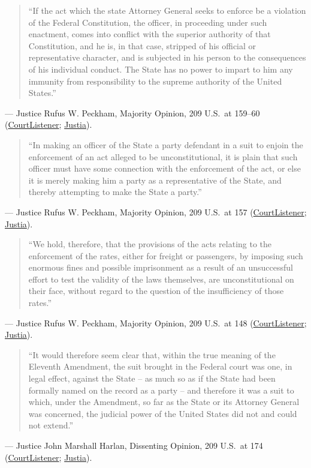 \documentclass[12pt]{article}
\begin{document}
\begin{quote}
``If the act which the state Attorney General seeks to enforce be a violation of the Federal Constitution, the officer, in proceeding under such enactment, comes into conflict with the superior authority of that Constitution, and he is, in that case, stripped of his official or representative character, and is subjected in his person to the consequences of his individual conduct. The State has no power to impart to him any immunity from responsibility to the supreme authority of the United States.''
\end{quote}
\noindent --- Justice Rufus W. Peckham, Majority Opinion, 209 U.S.\ at 159--60 (\href{https://www.courtlistener.com/opinion/96819/ex-parte-young/}{CourtListener}; \href{https://supreme.justia.com/cases/federal/us/209/123/}{Justia}).

\begin{quote}
``In making an officer of the State a party defendant in a suit to enjoin the enforcement of an act alleged to be unconstitutional, it is plain that such officer must have some connection with the enforcement of the act, or else it is merely making him a party as a representative of the State, and thereby attempting to make the State a party.''
\end{quote}
\noindent --- Justice Rufus W. Peckham, Majority Opinion, 209 U.S.\ at 157 (\href{https://www.courtlistener.com/opinion/96819/ex-parte-young/}{CourtListener}; \href{https://supreme.justia.com/cases/federal/us/209/123/}{Justia}).

\begin{quote}
``We hold, therefore, that the provisions of the acts relating to the enforcement of the rates, either for freight or passengers, by imposing such enormous fines and possible imprisonment as a result of an unsuccessful effort to test the validity of the laws themselves, are unconstitutional on their face, without regard to the question of the insufficiency of those rates.''
\end{quote}
\noindent --- Justice Rufus W. Peckham, Majority Opinion, 209 U.S.\ at 148 (\href{https://www.courtlistener.com/opinion/96819/ex-parte-young/}{CourtListener}; \href{https://supreme.justia.com/cases/federal/us/209/123/}{Justia}).

\begin{quote}
``It would therefore seem clear that, within the true meaning of the Eleventh Amendment, the suit brought in the Federal court was one, in legal effect, against the State -- as much so as if the State had been formally named on the record as a party -- and therefore it was a suit to which, under the Amendment, so far as the State or its Attorney General was concerned, the judicial power of the United States did not and could not extend.''
\end{quote}
\noindent --- Justice John Marshall Harlan, Dissenting Opinion, 209 U.S.\ at 174 (\href{https://www.courtlistener.com/opinion/96819/ex-parte-young/}{CourtListener}; \href{https://supreme.justia.com/cases/federal/us/209/123/}{Justia}).
\end{document}
